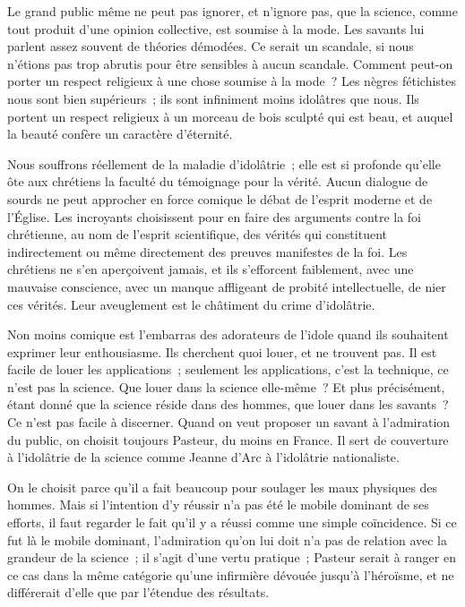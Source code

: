 \documentclass[french,twoside]{book} %
\begin{document}
Le grand public même ne peut pas ignorer, et n’ignore pas, que la science, comme tout produit d'une opinion collective, est soumise à la mode. Les savants lui parlent assez souvent de théories démodées. Ce serait un scandale, si nous n'étions pas trop abrutis pour être sensibles à aucun scandale. Comment peut-on porter un respect religieux à une chose soumise à la mode ? Les nègres fétichistes nous sont bien supérieurs ; ils sont infiniment moins idolâtres que nous. Ils portent un respect religieux à un morceau de bois sculpté qui est beau, et auquel la beauté confère un caractère d'éternité.\par
Nous souffrons réellement de la maladie d'idolâtrie ; elle est si profonde qu'elle ôte aux chrétiens la faculté du témoignage pour la vérité. Aucun dialogue de sourds ne peut approcher en force comique le débat de l'esprit moderne et de l'Église. Les incroyants choisissent pour en faire des arguments contre la foi chrétienne, au nom de l'esprit scientifique, des vérités qui constituent indirectement ou même directement des preuves manifestes de la foi. Les chrétiens ne s'en aperçoivent jamais, et ils s'efforcent faiblement, avec une mauvaise conscience, avec un manque affligeant de probité intellectuelle, de nier ces vérités. Leur aveuglement est le châtiment du crime d'idolâtrie.\par
Non moins comique est l'embarras des adorateurs de l'idole quand ils souhaitent exprimer leur enthousiasme. Ils cherchent quoi louer, et ne trouvent pas. Il est facile de louer les applications ; seulement les applications, c'est la technique, ce n'est pas la science. Que louer dans la science elle-même ? Et plus précisément, étant donné que la science réside dans des hommes, que louer dans les savants ? Ce n'est pas facile à discerner. Quand on veut proposer un savant à l'admiration du public, on choisit toujours Pasteur, du moins en France. Il sert de couverture à l'idolâtrie de la science comme Jeanne d'Arc à l'idolâtrie nationaliste.\par
On le choisit parce qu'il a fait beaucoup pour soulager les maux physiques des hommes. Mais si l'intention d'y réussir n'a pas été le mobile dominant de ses efforts, il faut regarder le fait qu'il y a réussi comme une simple coïncidence. Si ce fut là le mobile dominant, l'admiration qu'on lui doit n'a pas de relation avec la grandeur de la science ; il s'agit d'une vertu pratique ; Pasteur serait à ranger en ce cas dans la même catégorie qu'une infirmière dévouée jusqu'à l'héroïsme, et ne différerait d'elle que par l'étendue des résultats.\par
\end{document}
